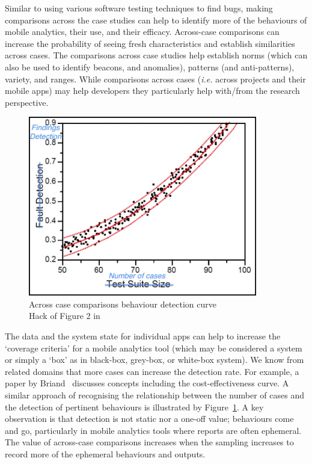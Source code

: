Similar to using various software testing techniques to find bugs, making comparisons across the case studies can help to identify more of the behaviours of mobile analytics, their use, and their efficacy. Across-case comparisons can increase the probability of seeing fresh characteristics and establish similarities across cases. The comparisons across case studies help establish norms (which can also be used to identify beacons, and anomalies), patterns (and anti-patterns), variety, and ranges. While comparisons across cases (\textit{i.e.} across projects and their mobile apps) may help developers they particularly help with/from the research perspective.

\begin{figure}
    \centering
    \includegraphics[width=10cm]{images/rough-sketches/across-case-comparisons.jpg}
    \caption{Across case comparisons behaviour detection curve \\Hack of Figure 2 in \citep[p.2]{briand2007_a_critical_analysis_of_empirical_research_in_software_testing}}
    \label{fig:across-case-comparisons-behaviour-detection-curve}
\end{figure}

The data and the system state for individual apps can help to increase the `coverage criteria' for a mobile analytics tool (which may be considered a system or simply a `box' as in black-box, grey-box, or white-box system). We know from related domains that more cases can increase the detection rate. For example, a paper by Briand~\citet{briand2007_a_critical_analysis_of_empirical_research_in_software_testing} discusses concepts including the cost-effectiveness curve. A similar approach of recognising the relationship between the number of cases and the detection of pertinent behaviours is illustrated by Figure~\ref{fig:across-case-comparisons-behaviour-detection-curve}. A key observation is that detection is not static nor a one-off value; behaviours come and go, particularly in mobile analytics tools where reports are often ephemeral. The value of across-case comparisons increases when the sampling increases to record more of the ephemeral behaviours and outputs.

